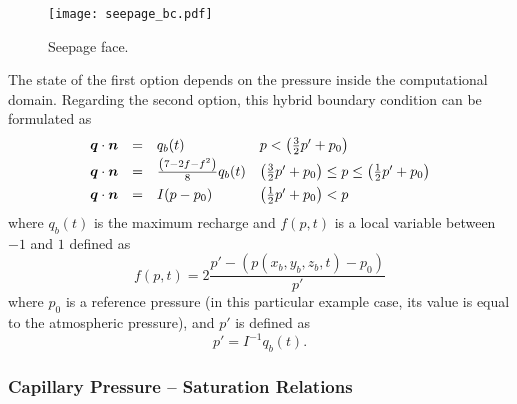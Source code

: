 \begin{figure}  [h]
\begin{center}
\texttt{[image: seepage\_bc.pdf]}
\caption{Seepage face.}
\label{fig:seepage_bc}
\end{center}
\end{figure}

The state of the first option depends on the pressure inside the computational domain.
Regarding the second option, this hybrid boundary condition \citep[based on][]{hamm2000} can be formulated as
\begin{equation} \label{eq:fifth_bc_richard}
\begin{array} {llll}
  {\boldsymbol{q}} \cdot \boldsymbol{n} & = & q_{b}(t) &  p < \left( \frac{3}{2} p' + p_{0} \right) \\[0.5ex]
  {\boldsymbol{q}} \cdot \boldsymbol{n} & = & \frac{\left(  7-2f-f^{2}  \right)}{8} q_{b}(t) 
                    & \left( \frac32 p' + p_{0} \right) \leq p \leq \left( \frac12 p' + p_{0} \right) \\[1.0ex]
  {\boldsymbol{q}} \cdot \boldsymbol{n} & = & I (p - p_{0}) & \left( \frac{1}{2} p' + p_{0} \right) < p 
\end{array} 
\end{equation}
where $q_{b}(t)$ is the maximum recharge and $f(p,t)$ is a local variable between $-1$ and $1$ 
defined as 
\begin{equation}
  f(p,t) = 2 \frac{p'- (p(x_{b},y_{b},z_{b},t) - p_{0}) }{p'}
\end{equation}
where $p_{0}$ is a reference pressure (in this particular example case, its value is equal to 
the atmospheric pressure), and $p'$ is defined as 
\begin{equation}
  p' = I^{-1} q_{b}(t).
\end{equation}


\subsubsection{Capillary Pressure -- Saturation Relations}  
\label{sec:richards-pc_s_relations}

